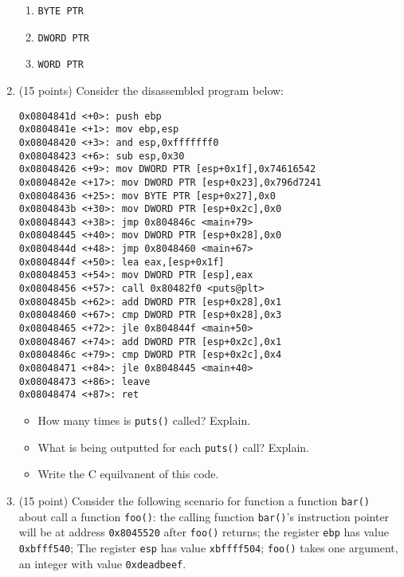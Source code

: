 \documentclass{article}[9pt]
\begin{document}
\begin{enumerate}
\begin{enumerate}
\item \texttt{BYTE PTR}

\item \texttt{DWORD PTR}

\item \texttt{WORD PTR}
\end{enumerate}

\item (15 points) Consider the disassembled program below:

\begin{verbatim}
0x0804841d <+0>: push ebp
0x0804841e <+1>: mov ebp,esp
0x08048420 <+3>: and esp,0xfffffff0
0x08048423 <+6>: sub esp,0x30
0x08048426 <+9>: mov DWORD PTR [esp+0x1f],0x74616542
0x0804842e <+17>: mov DWORD PTR [esp+0x23],0x796d7241
0x08048436 <+25>: mov BYTE PTR [esp+0x27],0x0
0x0804843b <+30>: mov DWORD PTR [esp+0x2c],0x0
0x08048443 <+38>: jmp 0x804846c <main+79>
0x08048445 <+40>: mov DWORD PTR [esp+0x28],0x0
0x0804844d <+48>: jmp 0x8048460 <main+67>
0x0804844f <+50>: lea eax,[esp+0x1f]
0x08048453 <+54>: mov DWORD PTR [esp],eax
0x08048456 <+57>: call 0x80482f0 <puts@plt>
0x0804845b <+62>: add DWORD PTR [esp+0x28],0x1
0x08048460 <+67>: cmp DWORD PTR [esp+0x28],0x3
0x08048465 <+72>: jle 0x804844f <main+50>
0x08048467 <+74>: add DWORD PTR [esp+0x2c],0x1
0x0804846c <+79>: cmp DWORD PTR [esp+0x2c],0x4
0x08048471 <+84>: jle 0x8048445 <main+40>
0x08048473 <+86>: leave
0x08048474 <+87>: ret 
\end{verbatim}

\begin{itemize}
\item How many times is \texttt{puts()} called? Explain.

\item What is being outputted for each \texttt{puts()} call? Explain.

\item Write the C equilvanent of this code.
\end{itemize}

\item (15 point) Consider the following scenario for function a function \texttt{bar()}
about call a function \texttt{foo()}: the calling function \texttt{bar()}'s
instruction pointer will be at address \texttt{0x8045520} after \texttt{foo()}
returns; the register \texttt{ebp} has value \texttt{0xbfff540}; The register
\texttt{esp} has value \texttt{xbffff504}; \texttt{foo()} takes one argument, an
integer with value \texttt{0xdeadbeef}.


\end{enumerate}
\end{document}
